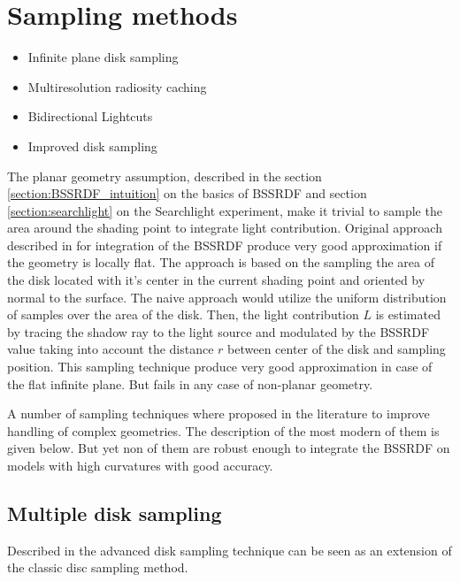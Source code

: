 \section{Sampling methods}
\label{sampling_methods}
\begin{itemize}
    \item{Infinite plane disk sampling \cite{Jensen:2001:PMS:383259.383319}}
    \item{Multiresolution radiosity caching \cite{Christensen:2012:MRC:2343045.2343108}}
    \item{Bidirectional Lightcuts \cite{Walter:2012:BL:2185520.2185555}}
    \item{Improved disk sampling \cite{King:2013:BIS:2504459.2504520}}
\end{itemize}

The planar geometry assumption, described in the section \ref{section:BSSRDF_intuition} on the 
basics of BSSRDF and section \ref{section:searchlight} on the  Searchlight experiment, make it
trivial to sample the area around the shading point to integrate light contribution. Original
approach described in \cite{Jensen:2001:PMS:383259.383319} for integration of the BSSRDF produce
very good approximation if the geometry is locally flat. The approach is based on the sampling the
area of the disk located with it's center in the current shading point and oriented by normal to the
surface. The naive approach would utilize the uniform distribution of samples over the area of the
disk. Then, the light contribution $L$ is estimated by tracing the shadow ray to the light source
and modulated by the BSSRDF value taking into account the distance $r$ between center of the disk
and sampling position.  This sampling technique
produce very good approximation in case of the flat infinite plane. But fails in any case of
non-planar geometry. 

A number of sampling techniques where proposed in the literature to improve handling of complex
geometries. The description of the most modern of them is given below. But yet non of them are
robust enough to integrate the BSSRDF on models with high curvatures with good accuracy.

\subsection{Multiple disk sampling}
Described in \cite{King:2013:BIS:2504459.2504520} the advanced disk sampling technique can be seen
as an extension of the classic disc sampling method.

